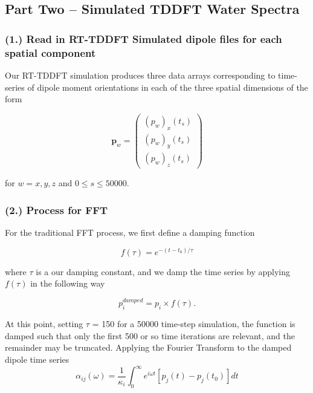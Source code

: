 \documentclass[11pt]{article}
\begin{document}
\subsection*{Part Two -- Simulated TDDFT Water Spectra}

\subsubsection*{(1.)	Read in RT-TDDFT Simulated dipole files for each spatial component}
Our RT-TDDFT simulation produces three data arrays corresponding to time-series of dipole moment orientations in each of the three spatial dimensions of the form

\begin{equation}
	\mathbf{p}_{w}= \begin{pmatrix} (p_{w})_{x}(t_{s})\\  (p_{w})_{y}(t_{s}) \\  (p_{w})_{z}(t_{s})\end{pmatrix}
\end{equation}

for $w = x, y, z$ and $0 \leq s \leq 50000$.

\subsubsection*{(2.)	Process for FFT}

For the traditional FFT process, we first define a damping function 

\begin{equation}
	f(\tau) = e^{-(t - t_{0}) / \tau}
\end{equation}

where $\tau$ is a our damping constant, and we damp the time series by applying $f(\tau)$ in the following way

\begin{equation}
	p_{i}^{damped} = p_{i} \times f(\tau).
\end{equation}

At this point, setting $\tau$ = 150 for a 50000 time-step simulation, the function is damped such that only the first 500 or so time iterations are relevant, and the remainder may be truncated.  Applying the Fourier Transform to the damped dipole time series 
\begin{equation}
	\alpha_{ij}(\omega) = \frac{1}{\kappa_{i}}\int_{0}^{\infty}  e^{i\omega t} [p_{j}(t) - p_{j}(t_{0})] dt
\end{equation}
\end{document}

